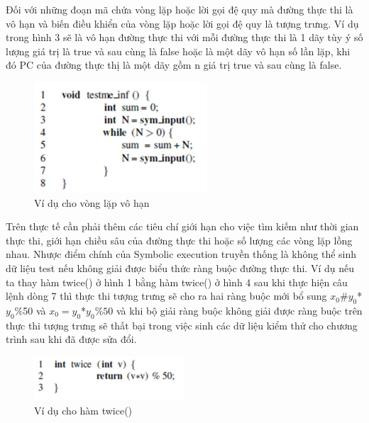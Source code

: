 \documentclass[12pt,a4paper]{article}
\begin{document}
\indent Đối với những đoạn mã chứa vòng lặp hoặc lời gọi đệ quy mà đường thực thi là vô hạn và biến điều khiển của vòng lặp hoặc lời gọi đệ quy là tượng trưng. Ví dụ trong hình 3 sẽ là vô hạn đường thực thi với mỗi đường thực thi là 1 dãy tùy ý số lượng giá trị là true và sau cùng là false hoặc là một dãy vô hạn số lần lặp, khi đó PC của đường thực thị là một dãy gồm n giá trị true và sau cùng là false.\newline
\begin{figure}[ht]
\begin{center}
\includegraphics{hinhanh/hinh3}
\end{center}
\caption{Ví dụ cho vòng lặp vô hạn}
\end{figure}
\indent Trên thực tế cần phải thêm các tiêu chí giới hạn cho việc tìm kiếm như thời gian thực thi, giới hạn chiều sâu của đường thực thi hoặc số lượng các vòng lặp lồng nhau.\newline
\indent Nhược điểm chính của Symbolic execution truyền thống là không thể sinh dữ liệu test nếu không giải được biểu thức ràng buộc đường thực thi. Ví dụ nếu ta thay hàm twice() ở hình 1 bằng hàm twice() ở hình 4 sau khi thực hiện câu lệnh dòng 7 thì thực thi tượng trưng sẽ cho ra hai ràng buộc mới bổ sung $x_0$\#$y_0$*$y_0$\%50 và $x_0=y_0$*$y_0$\%$50$ và khi bộ giải ràng buộc không giải được ràng buộc trên thực thi tượng trưng sẽ thất bại trong việc sinh các dữ liệu kiểm thử cho chương trình sau khi đã được sửa đổi.\newline
\begin{figure}[ht]
\begin{center}
\includegraphics{hinhanh/hinh4}
\end{center}
\caption{Ví dụ cho hàm twice()}
\end{figure}
\end{document}
